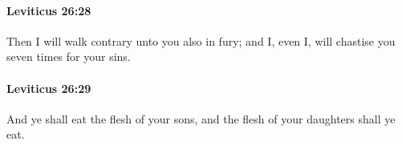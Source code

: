 		\paragraph{Leviticus 26:28} %
			\label{LEVITICUS-26-28}

			Then I will walk contrary unto you also in fury; and I, even I, will chastise you seven times for your sins.


		\paragraph{Leviticus 26:29} %
			\label{LEVITICUS-26-29}

			And ye shall eat the flesh of your sons, and the flesh of your daughters shall ye eat.


